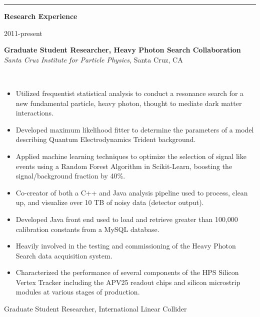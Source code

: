\documentclass[11pt]{article}
\newcommand{\cvsection}[1] {
    \noindent
    \textcolor{indigodye}{\rule{.15\textwidth}{.1in} \hspace{0.01 \textwidth} \textbf{\Large{#1}}} \newline
}
\newcommand{\experienceentry}[5] { 
    \noindent
    \begin{minipage}[t]{0.15\textwidth} \begin{flushright} #1 \end{flushright} \end{minipage} \hspace{0.01\textwidth}
    \begin{minipage}[t]{0.84\textwidth} 
        \textbf{#2} \newline
        \emph{#3}, #4 
    \end{minipage} \\[0.01pt]
    #5 \vspace{11pt}
}
\begin{document}
    \cvsection{Research Experience}
        \experienceentry{2011-present}
                        {Graduate Student Researcher, Heavy Photon Search Collaboration}
                        {Santa Cruz Institute for Particle Physics}
                        {Santa Cruz, CA}
                        {   
                            \begin{itemize}[label=\textcolor{indigodye}{$\circ$}, noitemsep, nolistsep, leftmargin=0.19\textwidth]
                              \item Utilized frequentist statistical analysis to conduct a resonance search for a new
                                    fundamental particle, heavy photon, thought to mediate dark matter 
                                    interactions.
                              \item Developed maximum likelihood fitter to determine the parameters of a model 
                                    describing Quantum Electrodynamics Trident background.
                              \item Applied machine learning techniques to optimize the selection of signal like 
                                    events using a Random Forest Algorithm in Scikit-Learn, boosting the 
                                    signal/background fraction by 40\%.
                              \item Co-creator of both a C++ and Java analysis pipeline used to process, clean up,
                                    and visualize over 10 TB of noisy data (detector output).
                              \item Developed Java front end used to load and retrieve greater than 100,000 
                                    calibration constants from a MySQL database.
                              \item Heavily involved in the testing and commissioning of the Heavy Photon Search data
                                    acquisition system.
                              \item Characterized the performance of several components of the HPS Silicon Vertex Tracker
                                    including the APV25 readout chips and silicon microstrip modules at various stages
                                    of production.
                          \end{itemize} 
                      } 
                        {Graduate Student Researcher, International Linear Collider}
\end{document}
